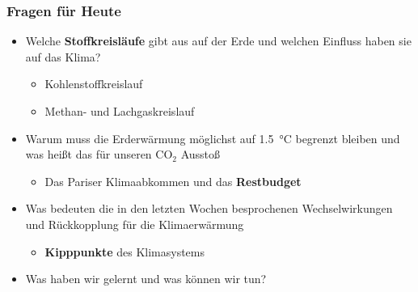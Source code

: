 \begin{frame}
	\frametitle{Fragen für Heute}
	\begin{itemize}
		\item Welche \textbf{Stoffkreisläufe} gibt aus auf der Erde und welchen Einfluss haben sie auf das Klima?
		\begin{itemize}
			\item Kohlenstoffkreislauf
			\item Methan- und Lachgaskreislauf
		\end{itemize}
		\item Warum muss die Erderwärmung möglichst auf \SI{1.5}{\degreeCelsius} begrenzt bleiben und was heißt das für unseren CO$_2$ Ausstoß
		\begin{itemize}
			\item Das Pariser Klimaabkommen und das \textbf{Restbudget}
		\end{itemize}
		\item Was bedeuten die in den letzten Wochen besprochenen Wechselwirkungen und Rückkopplung für die Klimaerwärmung
		\begin{itemize}
			\item \textbf{Kipppunkte} des Klimasystems
		\end{itemize}
		\item Was haben wir gelernt und was können wir tun?
	\end{itemize}
\end{frame}